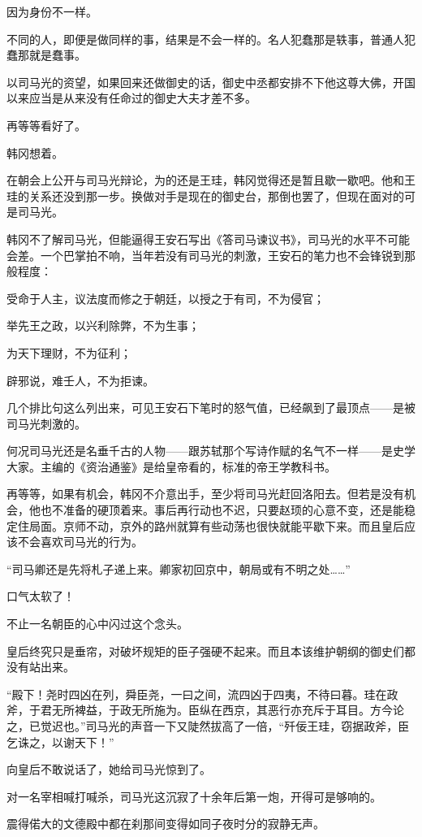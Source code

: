 因为身份不一样。

不同的人，即便是做同样的事，结果是不会一样的。名人犯蠢那是轶事，普通人犯蠢那就是蠢事。

以司马光的资望，如果回来还做御史的话，御史中丞都安排不下他这尊大佛，开国以来应当是从来没有任命过的御史大夫才差不多。

再等等看好了。

韩冈想着。

在朝会上公开与司马光辩论，为的还是王珪，韩冈觉得还是暂且歇一歇吧。他和王珪的关系还没到那一步。换做对手是现在的御史台，那倒也罢了，但现在面对的可是司马光。

韩冈不了解司马光，但能逼得王安石写出《答司马谏议书》，司马光的水平不可能会差。一个巴掌拍不响，当年若没有司马光的刺激，王安石的笔力也不会锋锐到那般程度：

受命于人主，议法度而修之于朝廷，以授之于有司，不为侵官；

举先王之政，以兴利除弊，不为生事；

为天下理财，不为征利；

辟邪说，难壬人，不为拒谏。

几个排比句这么列出来，可见王安石下笔时的怒气值，已经飙到了最顶点——是被司马光刺激的。

何况司马光还是名垂千古的人物——跟苏轼那个写诗作赋的名气不一样——是史学大家。主编的《资治通鉴》是给皇帝看的，标准的帝王学教科书。

再等等，如果有机会，韩冈不介意出手，至少将司马光赶回洛阳去。但若是没有机会，他也不准备的硬顶着来。事后再行动也不迟，只要赵顼的心意不变，还是能稳定住局面。京师不动，京外的路州就算有些动荡也很快就能平歇下来。而且皇后应该不会喜欢司马光的行为。

“司马卿还是先将札子递上来。卿家初回京中，朝局或有不明之处……”

口气太软了！

不止一名朝臣的心中闪过这个念头。

皇后终究只是垂帘，对破坏规矩的臣子强硬不起来。而且本该维护朝纲的御史们都没有站出来。

“殿下！尧时四凶在列，舜臣尧，一曰之间，流四凶于四夷，不待曰暮。珪在政斧，于君无所裨益，于政无所施为。臣纵在西京，其恶行亦充斥于耳目。方今论之，已觉迟也。”司马光的声音一下又陡然拔高了一倍，“歼佞王珪，窃据政斧，臣乞诛之，以谢天下！”

向皇后不敢说话了，她给司马光惊到了。

对一名宰相喊打喊杀，司马光这沉寂了十余年后第一炮，开得可是够响的。

震得偌大的文德殿中都在刹那间变得如同子夜时分的寂静无声。


